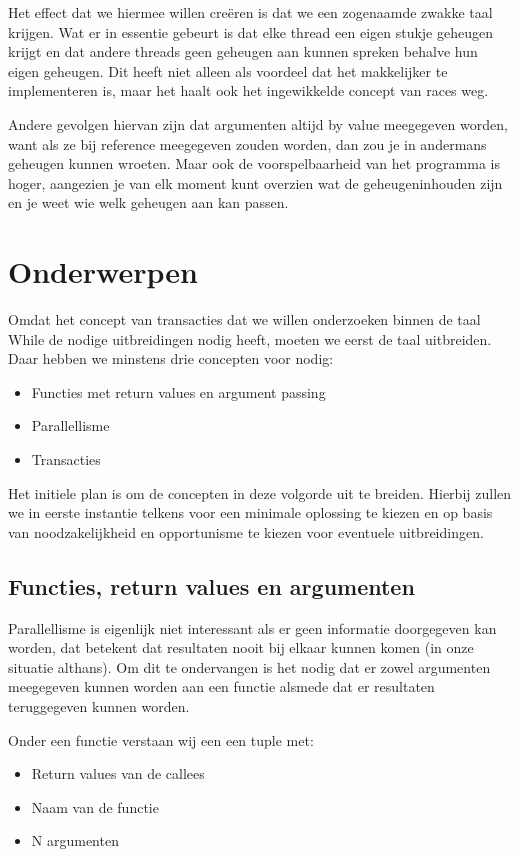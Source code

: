 Het effect dat we hiermee willen cre\"eren is dat we een zogenaamde zwakke taal krijgen. Wat er in essentie gebeurt is
dat elke thread een eigen stukje geheugen krijgt en dat andere threads geen geheugen aan kunnen spreken behalve hun
eigen geheugen. Dit heeft niet alleen als voordeel dat het makkelijker te implementeren is, maar het haalt ook het
ingewikkelde concept van races weg.

Andere gevolgen hiervan zijn dat argumenten altijd by value meegegeven worden, want als ze bij reference meegegeven
zouden worden, dan zou je in andermans geheugen kunnen wroeten. Maar ook de voorspelbaarheid van het programma is
hoger, aangezien je van elk moment kunt overzien wat de geheugeninhouden zijn en je weet wie welk geheugen aan kan
passen.

\section{Onderwerpen}
Omdat het concept van transacties dat we willen onderzoeken binnen de taal While de nodige uitbreidingen nodig heeft,
moeten we eerst de taal uitbreiden. Daar hebben we minstens drie concepten voor nodig:

\begin{itemize}
\item Functies met return values en argument passing
\item Parallellisme
\item Transacties
\end{itemize}

Het initiele plan is om de concepten  in deze volgorde uit te breiden. Hierbij zullen we in eerste instantie telkens
voor een minimale oplossing te kiezen en op basis van noodzakelijkheid en opportunisme te kiezen voor eventuele
uitbreidingen.

\subsection{Functies, return values en argumenten}
Parallellisme is eigenlijk niet interessant als er geen informatie doorgegeven kan worden, dat betekent dat resultaten
nooit bij elkaar kunnen komen (in onze situatie althans). Om dit te ondervangen is het nodig dat er zowel argumenten
meegegeven kunnen worden aan een functie alsmede dat er resultaten teruggegeven kunnen worden.

Onder een functie verstaan wij een een tuple met:
\begin{itemize}
\item Return values van de callees
\item Naam van de functie
\item N argumenten
\end{itemize}

